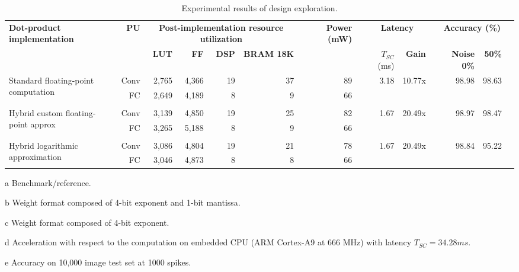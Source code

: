 \begin{table}[!t]
	\begin{threeparttable}
		\centering
		\caption{Experimental results of design exploration.}\label{tab:results}
		\scriptsize
		\begin{tabular}{lrrrrrrrrrrrrrr}\toprule
			\multirow{2}{*}{\textbf{Dot-product implementation}} &\multirow{2}{*}{\textbf{PU}} &\multicolumn{4}{c}{\textbf{Post-implementation resource utilization}} & &\multirow{2}{*}{\textbf{Power (mW)}} & &\multicolumn{2}{c}{\textbf{Latency}} & &\multicolumn{2}{c}{\textbf{Accuracy (\%)\tnote{e}}} \\\cmidrule{3-6}\cmidrule{10-11}\cmidrule{13-14}
			& &\textbf{LUT} &\textbf{FF} &\textbf{DSP} &\textbf{BRAM 18K} & & & &$T_{SC}$ (ms) &\textbf{Gain\tnote{d}} & &\textbf{Noise 0\%} &\textbf{50\%} \\\midrule
			\multirow{2}{*}{Standard floating-point computation\tnote{a}} &Conv &2,765 &4,366 &19 &37 & &89 & &\multirow{2}{*}{3.18} &\multirow{2}{*}{10.77x} & &\multirow{2}{*}{98.98} &\multirow{2}{*}{98.63} \\
			&FC &2,649 &4,189 &8 &9 & &66 & & & & & & \\
			& & & & & & & & & & & & & \\
			\multirow{2}{*}{Hybrid custom floating-point approx\tnote{b}} &Conv &3,139 &4,850 &19 &25 & &82 & &\multirow{2}{*}{1.67} &\multirow{2}{*}{20.49x} & &\multirow{2}{*}{98.97} &\multirow{2}{*}{98.47} \\
			&FC &3,265 &5,188 &8 &9 & &66 & & & & & & \\
			& & & & & & & & & & & & & \\
			\multirow{2}{*}{Hybrid logarithmic approximation\tnote{c}} &Conv &3,086 &4,804 &19 &21 & &78 & &\multirow{2}{*}{1.67} &\multirow{2}{*}{20.49x} & &\multirow{2}{*}{98.84} &\multirow{2}{*}{95.22} \\
			&FC &3,046 &4,873 &8 &8 & &66 & & & & & & \\
			\bottomrule
		\end{tabular}
		\begin{tablenotes}
			\scriptsize
			\item[a] Benchmark/reference.
			\item[b] Weight format composed of 4-bit exponent and 1-bit mantissa.
			\item[c] Weight format composed of 4-bit exponent.
			\item[d] Acceleration with respect to the computation on embedded CPU (ARM Cortex-A9 at 666 MHz) with latency $T_{SC} = 34.28 ms$.
			\item[e] Accuracy on 10,000 image test set at 1000 spikes.
		\end{tablenotes}
	\end{threeparttable}
\end{table}